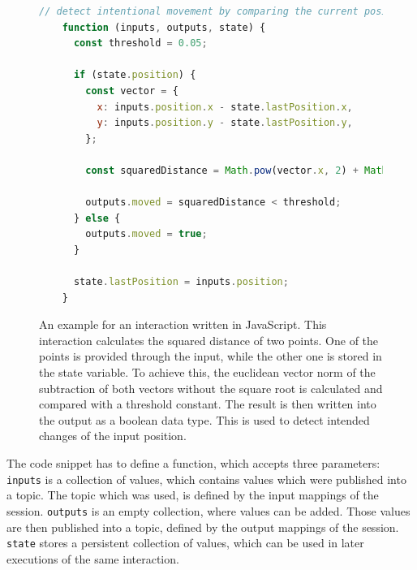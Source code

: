 \begin{figure}[H]
  \begin{lstlisting}[language=JavaScript]
    // detect intentional movement by comparing the current position with a previous one
    function (inputs, outputs, state) {
      const threshold = 0.05;

      if (state.position) {
        const vector = {
          x: inputs.position.x - state.lastPosition.x,
          y: inputs.position.y - state.lastPosition.y,
        };
  
        const squaredDistance = Math.pow(vector.x, 2) + Math.pow(vector.y, 2);
  
        outputs.moved = squaredDistance < threshold;
      } else {
        outputs.moved = true;
      }

      state.lastPosition = inputs.position;
    }
  \end{lstlisting}
  \caption[Basic UBII interaction in JavaScript]{An example for an interaction written in JavaScript. This interaction calculates the squared distance of two points. One of the points is provided through the input, while the other one is stored in the state variable. To achieve this, the euclidean vector norm of the subtraction of both vectors without the square root is calculated and compared with a threshold constant. The result is then written into the output as a boolean data type. This is used to detect intended changes of the input position.}\label{fig:ubii-interaction-example}
\end{figure}

The code snippet has to define a function, which accepts three parameters: 
\lstinline{inputs} is a collection of values, which contains values which were published into a topic. The topic which was used, is defined by the input mappings of the session. \lstinline{outputs} is an empty collection, where values can be added. Those values are then published into a topic, defined by the output mappings of the session. \lstinline{state} stores a persistent collection of values, which can be used in later executions of the same interaction.